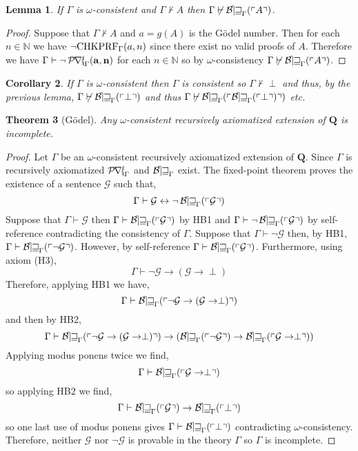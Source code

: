\documentclass[12pt, leqno]{article}
\newcommand{\N}{\mathbb{N}}
\renewcommand{\bf}[1]{\mathbf{#1}}
\newcommand{\proves}{\vdash}
\theoremstyle{theorem}
\newtheorem{theorem}{Theorem}[section]
\newtheorem{lemma}[theorem]{Lemma}
\newtheorem{corollary}[theorem]{Corollary}
\theoremstyle{definition}
\theoremstyle{definition}
\theoremstyle{remark}
\theoremstyle{definition}
\theoremstyle{remark}
\DeclareMathOperator{\Prf}{\mathcal{P\mkern-2mu r\mkern-2.5mu f\mkern-2mu}}
\DeclareMathOperator{\Bew}{\mathcal{B\mkern-2.0mu e\mkern-2.0mu w\mkern-1mu}}
\begin{document}
\begin{lemma}
If $\Gamma$ is $\omega$-consistent and $\Gamma \not\proves A$ then $\Gamma \not\proves \Thm{A}$. 
\end{lemma}

\begin{proof}
Suppose that $\Gamma \not\proves A$ and $a = g(A)$ is the G\"{o}del number. Then for each $n \in \N$ we have $\neg \mathrm{CHKPRF}_{\Gamma}(a, n)$ since there exist no valid proofs of $A$. Therefore we have $\Gamma \proves \neg \Prf_{\Gamma}(\bf{a}, \bf{n})$ for each $n \in \N$ so by $\omega$-consistency $\Gamma \not\proves \Thm{A}$. 
\end{proof}

\begin{corollary}
If $\Gamma$ is $\omega$-consistent then $\Gamma$ is consistent so $\Gamma \not\proves \perp$ and thus, by the previous lemma, $\Gamma \not\proves \Thm{\perp}$ and thus $\Gamma \not\proves \Thm{\Thm{\perp}}$ etc. 
\end{corollary}

\begin{theorem}[G\"{o}del]
Any $\omega$-consistent recursively axiomatized extension of $\bf{Q}$ is incomplete. 
\end{theorem}

\begin{proof}
Let $\Gamma$ be an $\omega$-consistent recursively axiomatized extension of $\bf{Q}$. Since $\Gamma$ is recursively axiomatized $\Prf_{\Gamma}$ and $\Bew_{\Gamma}$ exist. 
The fixed-point theorem proves the existence of a sentence $\mathcal{G}$ such that,
\[ \Gamma \proves \mathcal{G} \leftrightarrow \neg \Thm{\mathcal{G}} \]
Suppose that $\Gamma \proves \mathcal{G}$ then $\Gamma \proves \Thm{\mathcal{G}}$ by HB1 and $\Gamma \proves \neg \Thm{\mathcal{G}}$ by self-reference contradicting the consistency of $\Gamma$. Suppose that $\Gamma \proves \neg \mathcal{G}$ then, by HB1, $\Gamma \proves \Thm{\neg \mathcal{G}}$. However, by self-reference $\Gamma \proves \Thm{\mathcal{G}}$. Furthermore, using axiom (H3),
\[ \Gamma \proves \neg \mathcal{G} \to (\mathcal{G} \to \perp) \]  
Therefore, applying HB1 we have,
\[ \Gamma \proves \Thm{\neg \mathcal{G} \to (\mathcal{G} \to \perp)} \]
and then by HB2,
\[ \Gamma \proves \Thm{\neg \mathcal{G} \to (\mathcal{G} \to \perp)} \to (\Thm{\neg \mathcal{G}} \to \Thm{\mathcal{G} \to \perp}) \]
Applying modus ponens twice we find,
\[ \Gamma \proves \Thm{\mathcal{G} \to \perp} \]
so applying HB2 we find,
\[ \Gamma \proves \Thm{\mathcal{G}} \to \Thm{\perp} \]
so one last use of modus ponens gives $\Gamma \proves \Thm{\perp}$ contradicting $\omega$-consistency. Therefore, neither $\mathcal{G}$ nor $\neg \mathcal{G}$ is provable in the theory $\Gamma$ so $\Gamma$ is incomplete. 
\end{proof}
\end{document}
